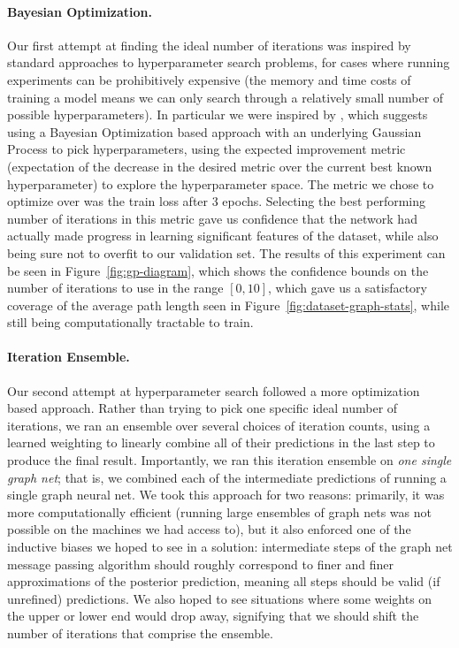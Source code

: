 \paragraph{Bayesian Optimization.}
Our first attempt at finding the ideal number of iterations was inspired by standard approaches to hyperparameter search problems, for cases where running experiments can be prohibitively expensive (the memory and time costs of training a model means we can only search through a relatively small number of possible hyperparameters).
In particular we were inspired by \cite{snoek2012practical}, which suggests using a Bayesian Optimization based approach with an underlying Gaussian Process to pick hyperparameters, using the expected improvement metric (expectation of the decrease in the desired metric over the current best known hyperparameter) to explore the hyperparameter space.
The metric we chose to optimize over was the train loss after 3 epochs.
Selecting the best performing number of iterations in this metric gave us confidence that the network had actually made progress in learning significant features of the dataset, while also being sure not to overfit to our validation set.
The results of this experiment can be seen in Figure~\ref{fig:gp-diagram}, which shows the confidence bounds on the number of iterations to use in the range $[0, 10]$, which gave us a satisfactory coverage of the average path length seen in Figure~\ref{fig:dataset-graph-stats}, while still being computationally tractable to train.

\paragraph{Iteration Ensemble.}
Our second attempt at hyperparameter search followed a more optimization based approach.
Rather than trying to pick one specific ideal number of iterations, we ran an ensemble over several choices of iteration counts, using a learned weighting to linearly combine all of their predictions in the last step to produce the final result.
Importantly, we ran this iteration ensemble on \emph{one single graph net}; that is, we combined each of the intermediate predictions of running a single graph neural net.
We took this approach for two reasons: primarily, it was more computationally efficient (running large ensembles of graph nets was not possible on the machines we had access to), but it also enforced one of the inductive biases we hoped to see in a solution: intermediate steps of the graph net message passing algorithm should roughly correspond to finer and finer approximations of the posterior prediction, meaning all steps should be valid (if unrefined) predictions.
We also hoped to see situations where some weights on the upper or lower end would drop away, signifying that we should shift the number of iterations that comprise the ensemble.

